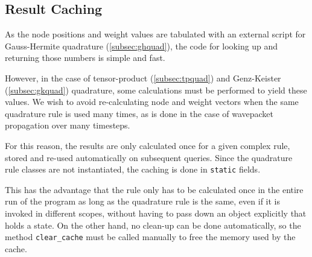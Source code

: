 \subsection{Result Caching}
\label{subsec:resultcaching}

As the node positions and weight values are tabulated with an external script
for Gauss-Hermite quadrature (\ref{subsec:ghquad}), the code for looking up and
returning those numbers is simple and fast.

However, in the case of tensor-product (\ref{subsec:tpquad}) and Genz-Keister
(\ref{subsec:gkquad}) quadrature, some calculations must be performed to yield
these values.
We wish to avoid re-calculating node and weight vectors when the same quadrature
rule is used many times, as is done in the case of wavepacket propagation over
many timesteps.

For this reason, the results are only calculated once for a given complex
rule, stored and re-used automatically on subsequent queries.
Since the quadrature rule classes are not instantiated, the caching is done in
\texttt{static} fields.

This has the advantage that the rule only has to be calculated once in the
entire run of the program as long as the quadrature rule is the same, even if it
is invoked in different scopes, without having to pass down an object explicitly
that holds a state.
On the other hand, no clean-up can be done automatically, so the method
\texttt{clear\_cache} must be called manually to free the memory used by the
cache.
